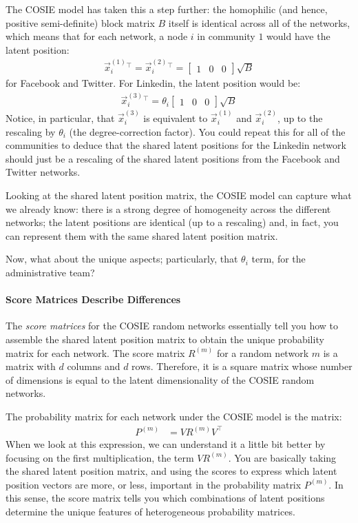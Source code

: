 The COSIE model has taken this a step further: the homophilic (and hence, positive semi-definite) block matrix $B$ itself is identical across all of the networks, which means that for each network, a node $i$ in community $1$ would have the latent position:
\begin{align*}
    \vec x_i^{(1)}^\top = \vec x_i^{(2)}^\top = \begin{bmatrix}1 & 0 & 0\end{bmatrix} \sqrt B
\end{align*}
for Facebook and Twitter. For Linkedin, the latent position would be:
\begin{align*}
    \vec x_i^{(3)}^\top = \theta_i\begin{bmatrix}1 & 0 & 0\end{bmatrix} \sqrt B
\end{align*}
Notice, in particular, that $\vec x_i^{(3)}$ is equivalent to $\vec x_i^{(1)}$ and $\vec x_i^{(2)}$, up to the rescaling by $\theta_i$ (the degree-correction factor). You could repeat this for all of the communities to deduce that the shared latent positions for the Linkedin network should just be a rescaling of the shared latent positions from the Facebook and Twitter networks.

Looking at the shared latent position matrix, the COSIE model can capture what we already know: there is a strong degree of {homogeneity} across the different networks; the latent positions are identical (up to a rescaling) and, in fact, you can represent them with the same shared latent position matrix. 

Now, what about the unique aspects; particularly, that $\theta_i$ term, for the administrative team?

\paragraph{Score Matrices Describe Differences}
\label{sec:ch5:multi:cosie:score}

The \textit{score matrices} for the COSIE random networks essentially tell you how to assemble the shared latent position matrix to obtain the unique probability matrix for each network. The score matrix $R^{(m)}$ for a random network $m$ is a matrix with $d$ columns and $d$ rows. Therefore, it is a square matrix whose number of dimensions is equal to the latent dimensionality of the COSIE random networks.

The probability matrix for each network under the COSIE model is the matrix:
\begin{align*}
    P^{(m)} &= VR^{(m)}V^\top
\end{align*}
When we look at this expression, we can understand it a little bit better by focusing on the first multiplication, the term $VR^{(m)}$. You are basically taking the shared latent position matrix, and using the scores to express which latent position vectors are more, or less, important in the probability matrix $P^{(m)}$. In this sense, the score matrix tells you which combinations of latent positions determine the unique features of heterogeneous probability matrices.

